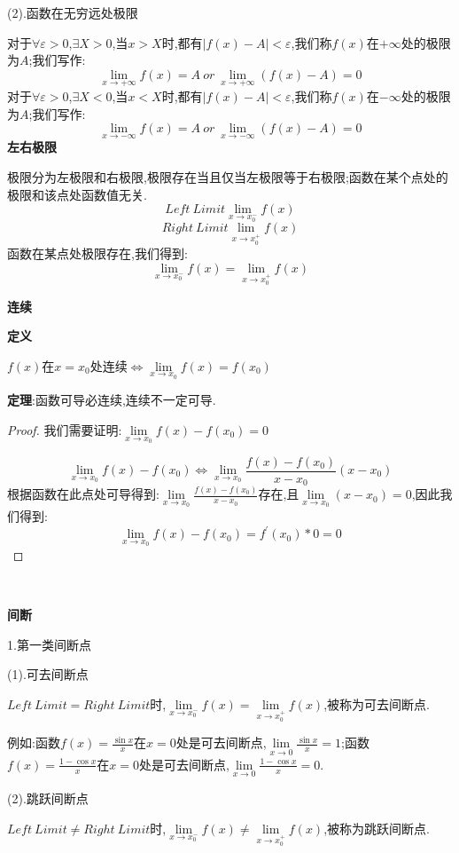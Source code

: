 \documentclass[oneside]{book}
\begin{document}
	(2).函数在无穷远处极限
	
	对于$\forall\varepsilon >0$,$\exists X>0$,当$x>X$时,都有$|f(x)-A|<\varepsilon$,我们称$f(x)$在$+\infty$处的极限为$A$;我们写作:
	$$\lim\limits_{x\rightarrow +\infty}f(x)=A\ or\ \lim\limits_{x\rightarrow +\infty}(f(x)-A)=0$$
	对于$\forall\varepsilon >0$,$\exists X<0$,当$x<X$时,都有$|f(x)-A|<\varepsilon$,我们称$f(x)$在$-\infty$处的极限为$A$;我们写作:
	$$\lim\limits_{x\rightarrow -\infty}f(x)=A\ or\ \lim\limits_{x\rightarrow -\infty}(f(x)-A)=0$$
	\textbf{左右极限}
	
	极限分为左极限和右极限,极限存在当且仅当左极限等于右极限;函数在某个点处的极限和该点处函数值无关.
	$$Left\ Limit \lim\limits_{x\rightarrow x_{0}^{-}}f(x)$$
	$$Right\ Limit\lim\limits_{x\rightarrow x_{0}^{+}}f(x) $$
	函数在某点处极限存在,我们得到:
	$$\lim\limits_{x\rightarrow x_{0}^{-}}f(x)=\lim\limits_{x\rightarrow x_{0}^{+}}f(x)$$
	\centerline{{\large \textbf{连续}}}
	
	\textbf{定义}
	
	$f(x)$在$x=x_{0}$处连续$\Leftrightarrow\lim\limits_{x\rightarrow x_{0}}f(x)=f(x_{0})$
	
	\textbf{定理}:函数可导必连续,连续不一定可导.
	\begin{proof}
		我们需要证明:$\lim\limits_{x\rightarrow x_{0}}f(x)-f(x_{0})=0$
		
		$$\lim\limits_{x\rightarrow x_{0}}f(x)-f(x_{0})\Leftrightarrow \lim\limits_{x\rightarrow x_{0}}\frac{f(x)-f(x_{0})}{x-x_{0}}(x-x_{0})$$根据函数在此点处可导得到:$\lim\limits_{x\rightarrow x_{0}}\frac{f(x)-f(x_{0})}{x-x_{0}}$存在,且$\lim\limits_{x\rightarrow x_{0}}(x-x_{0})=0$,因此我们得到:
		$$\lim\limits_{x\rightarrow x_{0}}f(x)-f(x_{0})=f^{'}(x_{0})*0=0$$
	\end{proof}
	\hspace{\fill}\
	
	\centerline{{\large \textbf{间断}}}
	
	1.第一类间断点
	
	(1).可去间断点
	
	$Left\ Limit=Right\ Limit$时,$\lim\limits_{x\rightarrow x_{0}^{-}}f(x)=\lim\limits_{x\rightarrow x_{0}^{+}}f(x)$,被称为可去间断点.
	
	例如:函数$f(x)=\frac{\sin x}{x}$在$x=0$处是可去间断点,$\lim\limits_{x\rightarrow 0}\frac{\sin x}{x}=1$;函数$f(x)=\frac{1-\cos x}{x}$在$x=0$处是可去间断点,$\lim\limits_{x\rightarrow 0}\frac{1-\cos x}{x}=0$.
	
	
	(2).跳跃间断点
	
	$Left\ Limit\neq Right\ Limit$时,$\lim\limits_{x\rightarrow x_{0}^{-}}f(x)\neq\lim\limits_{x\rightarrow x_{0}^{+}}f(x)$,被称为跳跃间断点.
	
\end{document}

